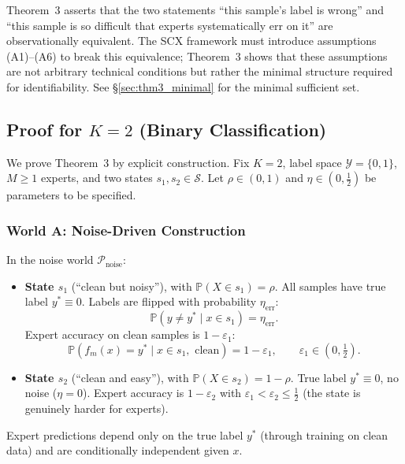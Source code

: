 \begin{remark}
  Theorem~3 asserts that the two statements ``this sample's label is wrong''
  and ``this sample is so difficult that experts systematically err on it'' are
  observationally equivalent.  The SCX framework must introduce assumptions
  (A1)--(A6) to break this equivalence; Theorem~3 shows that these assumptions
  are not arbitrary technical conditions but rather the minimal structure
  required for identifiability.  See \S\ref{sec:thm3_minimal} for the minimal
  sufficient set.
\end{remark}

\subsection{Proof for $K=2$ (Binary Classification)}
\label{sec:thm3_proof_K2}

We prove Theorem~3 by explicit construction.  Fix $K=2$, label space
$\mathcal{Y}=\{0,1\}$, $M\ge 1$ experts, and two states $s_1,s_2\in\mathcal{S}$.
Let $\rho\in(0,1)$ and $\eta\in(0,\tfrac12)$ be parameters to be specified.

\subsubsection{World A: Noise-Driven Construction}
\label{sec:thm3_worldA}

In the noise world $\mathcal{P}_{\text{noise}}$:

\begin{itemize}
  \item \textbf{State $s_1$} (``clean but noisy''), with
    $\mathbb{P}(X\in s_1)=\rho$.  All samples have true label $y^*\equiv0$.
    Labels are flipped with probability $\eta_{\text{err}}$:
    \[
    \mathbb{P}(y\neq y^* \mid x\in s_1)=\eta_{\text{err}}.
    \]
    Expert accuracy on clean samples is $1-\varepsilon_1$:
    \[
    \mathbb{P}(f_m(x)=y^* \mid x\in s_1,\text{ clean})=1-\varepsilon_1,
    \qquad \varepsilon_1\in(0,\tfrac12).
    \]
  \item \textbf{State $s_2$} (``clean and easy''), with
    $\mathbb{P}(X\in s_2)=1-\rho$.  True label $y^*\equiv0$, no noise
    ($\eta=0$).  Expert accuracy is $1-\varepsilon_2$ with
    $\varepsilon_1<\varepsilon_2\le\tfrac12$ (the state is genuinely harder
    for experts).
\end{itemize}

Expert predictions depend only on the true label $y^*$ (through training on
clean data) and are conditionally independent given $x$.

